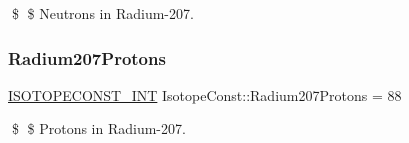 \$ \$ Neutrons in Radium-\/207. \mbox{\label{group___isotope_const-_radium-_ra207_ga7548ad0ca877255a2e503cc8404404e8}} 
\subsubsection{\texorpdfstring{Radium207\+Protons}{Radium207Protons}}
{\footnotesize\ttfamily \mbox{\hyperlink{group___isotope_const-_macros_ga5f18360b3e99483a35c32d789e62621c}{I\+S\+O\+T\+O\+P\+E\+C\+O\+N\+S\+T\+\_\+\+I\+NT}} Isotope\+Const\+::\+Radium207\+Protons = 88}

\$ \$ Protons in Radium-\/207. 